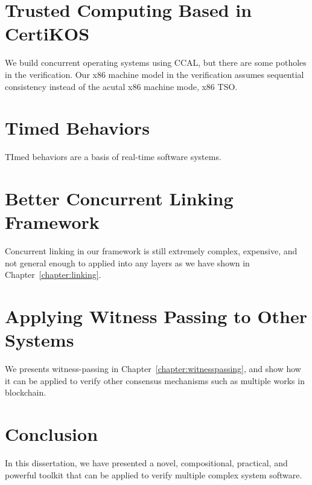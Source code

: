 \section{Trusted Computing Based in CertiKOS}
\label{chapter:conclusion:sec:trusted-computing-based-in-certikos}

We build concurrent operating systems using CCAL, but there are some potholes in the verification. 
Our x86 machine model in the verification assumes sequential consistency instead of the acutal x86 machine mode, x86 TSO.

\section{Timed Behaviors}
\label{chapter:conclusion:sec:timed-behaviors}
TImed behaviors are a basis of real-time software systems.

\section{Better Concurrent Linking Framework}
\label{chapter:conclusion:sec:better-concurrent-linking-framework}

Concurrent linking in our framework is still extremely complex, expensive, and not general enough to applied into any layers as we have shown in Chapter~\ref{chapter:linking}.  

\section{Applying Witness Passing to Other Systems}
\label{chapter:conclusion:sec:applying-witness-passing-to-other-systems}

We presents witness-passing in Chapter~\ref{chapter:witnesspassing}, and show how it can be applied to 
verify other consensus mechanisms such as multiple works in blockchain. 


\section{Conclusion}
\label{chapter:conclusion:sec:conclusion}

In this dissertation, we have presented a novel, compositional, practical, and powerful toolkit that can be applied to verify multiple complex system software. 
